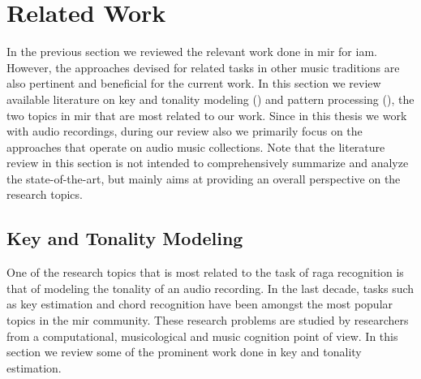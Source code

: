 \section{Related Work}
\label{sec:background_relevant_work_other_music}


In the previous section we reviewed the relevant work done in \gls{mir} for \gls{iam}. However, the approaches devised for related tasks in other music traditions are also pertinent and beneficial for the current work. In this section we review available literature on key and tonality modeling () and pattern processing (), the two topics in \gls{mir} that are most related to our work. Since in this thesis we work with audio recordings, during our review also we primarily focus on the approaches that operate on audio music collections. Note that the literature review in this section is not intended to comprehensively summarize and analyze the state-of-the-art, but mainly aims at providing an overall perspective on the research topics.



\subsection{Key and Tonality Modeling}
\label{sec:background_key_and_tonality_modeling}


One of the research topics that is most related to the task of \gls{raga} recognition is that of modeling the tonality of an audio recording. In the last decade, tasks such as key estimation and chord recognition have been amongst the most popular topics in the \gls{mir} community. These research problems are studied by researchers from a computational, musicological and music cognition point of view. In this section we review some of the prominent work done in key and tonality estimation. 

